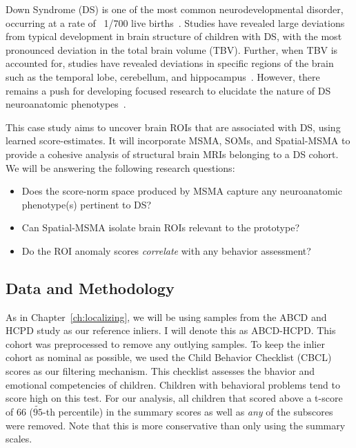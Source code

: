 Down Syndrome (DS) is one of the most common neurodevelopmental disorder, occurring at a rate of ~1/700 live births~\cite{parker2010updated}. Studies have revealed large deviations from typical development in brain structure of children with DS, with the most pronounced deviation in the total brain volume (TBV). Further, when TBV is accounted for, studies have revealed deviations in specific regions of the brain such as the temporal lobe, cerebellum, and hippocampus~\cite{hamnerPediatricBrainDevelopment2018}. However, there remains a push for developing focused research to elucidate the nature of DS neuroanatomic phenotypes~\cite{hamnerPediatricBrainDevelopment2018}.

This case study aims to uncover brain ROIs that are associated with DS, using learned score-estimates. It will incorporate MSMA, SOMs, and Spatial-MSMA to provide a cohesive analysis of structural brain MRIs belonging to a DS cohort. We will be answering the following research questions:

\begin{itemize}
    \item Does the score-norm space produced by MSMA capture any neuroanatomic phenotype(s) pertinent to DS?
    
    \item Can Spatial-MSMA isolate brain ROIs relevant to the prototype?
    
    \item Do the ROI anomaly scores \textit{correlate} with any behavior assessment?
\end{itemize}





\subsection*{Data and Methodology}
 
As in Chapter~\ref{ch:localizing}, we will be using samples from the ABCD and HCPD study as our reference inliers. I will denote this as ABCD-HCPD. This cohort was preprocessed to remove any outlying samples. To keep the inlier cohort as nominal as possible, we used the Child Behavior Checklist (CBCL)~ scores as our filtering mechanism. This checklist assesses the bhavior and emotional competencies of children. Children with behavioral problems tend to score high on this test. For our analysis, all children that scored above a t-score of 66 ($\tilde{95}$-th percentile) in the summary scores as well as \textit{any} of the subscores were removed. Note that this is more conservative than only using the summary scales.

